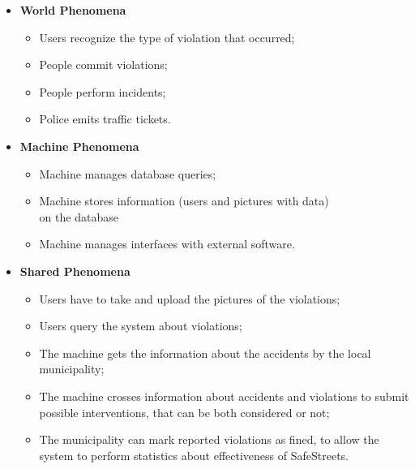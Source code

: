 \documentclass[../RASD.tex]{subfiles}
\begin{document}
        \begin{itemize}
            \item \textbf{World Phenomena}
            \begin{itemize}
                \item Users recognize the type of violation that occurred;
                \item People commit violations;
                \item People perform incidents;
                \item Police emits traffic tickets.
            \end{itemize}
            \item \textbf{Machine Phenomena}
            \begin{itemize}
                \item Machine manages database queries;
                \item Machine stores information (users and pictures with data)
                \\ on the database
                \item Machine manages interfaces with external software.
            \end{itemize}
            \item \textbf{Shared Phenomena}
            \begin{itemize}
                \item Users have to take and upload the pictures of the violations;
                \item Users query the system about violations;
                \item The machine gets the information about the accidents by the local municipality;
                \item The machine crosses information about accidents and violations to submit possible interventions, that can be both considered or not;
                \item The municipality can mark reported violations as fined, to allow the system to perform statistics about effectiveness of SafeStreets.
            \end{itemize}
        \end{itemize}
\end{document}
